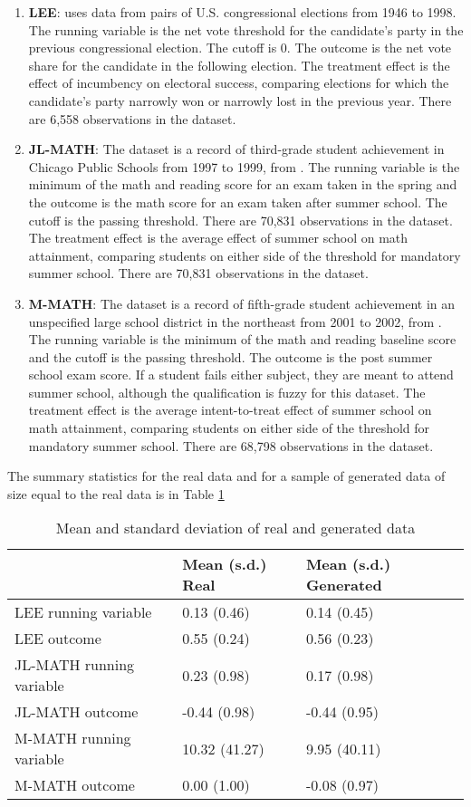 \documentclass[12pt]{article}
\theoremstyle{definition}
\begin{document}
\begin{enumerate} 
\item \textbf{LEE}: \citet{lee2010regression} uses data from pairs of U.S. congressional elections from 1946 to 1998. The running variable is the net vote threshold for the candidate's party in the previous congressional election. The cutoff is 0. The outcome is the net vote share for the candidate in the following election. The treatment effect is the effect of incumbency on electoral success, comparing elections for which the candidate's party narrowly won or narrowly lost in the previous year. There are 6,558 observations in the dataset. 
\item \textbf{JL-MATH}: The dataset is a record of third-grade student achievement in Chicago Public Schools from 1997 to 1999, from \citet{jacob2004remedial}. The running variable is the minimum of the math and reading score for an exam taken in the spring and the outcome is the math score for an exam taken after summer school. The cutoff is the passing threshold. There are 70,831 observations in the dataset.  The treatment effect is the average effect of summer school on math attainment, comparing students on either side of the threshold for mandatory summer school. There are 70,831 observations in the dataset. 
\item \textbf{M-MATH}: The dataset is a record of fifth-grade student achievement in an unspecified large school district in the northeast from 2001 to 2002, from  \citet{matsudaira2008mandatory}. The running variable is the minimum of the math and reading baseline score and the cutoff is the passing threshold. The outcome is the post summer school exam score. If a student fails either subject, they are meant to attend summer school, although the qualification is fuzzy for this dataset. The treatment effect is the average intent-to-treat effect of summer school on math attainment, comparing students on either side of the threshold for mandatory summer school. There are 68,798 observations in the dataset. 
\end{enumerate} 

The summary statistics for the real data and for a sample of generated data of size equal to the real data is in Table \ref{tab:summary} 

\begin{table} [ht] 
\centering 
\begin{tabular}{lll}
\toprule
  & Mean (s.d.) Real & Mean (s.d.) Generated\\
\midrule
LEE running variable & 0.13 (0.46) & 0.14 (0.45)\\
LEE outcome & 0.55 (0.24) & 0.56 (0.23)\\
JL-MATH running variable & 0.23 (0.98) & 0.17 (0.98)\\
JL-MATH outcome & -0.44 (0.98) & -0.44 (0.95)\\
M-MATH running variable & 10.32 (41.27) & 9.95 (40.11)\\
\addlinespace
M-MATH outcome & 0.00 (1.00) & -0.08 (0.97)\\
\bottomrule
\end{tabular}
\label{tab:summary} 
\caption{Mean and standard deviation of real and generated data} 
\end{table} 
\end{document}
